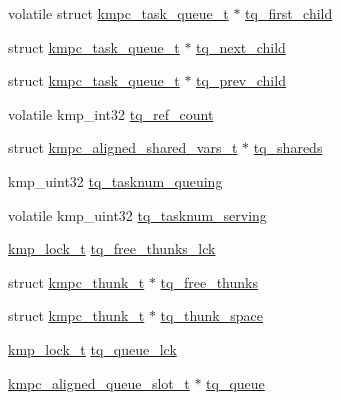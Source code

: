 \begin{DoxyCompactItemize}
\begin{tabbing}
\end{tabbing}\item 
volatile struct \hyperlink{structkmpc__task__queue__t}{kmpc\-\_\-task\-\_\-queue\-\_\-t} $\ast$ \hyperlink{structkmpc__task__queue__t_ada01d183c36f9a0ed158c8f354c78aa3}{tq\-\_\-first\-\_\-child}
\item 
struct \hyperlink{structkmpc__task__queue__t}{kmpc\-\_\-task\-\_\-queue\-\_\-t} $\ast$ \hyperlink{structkmpc__task__queue__t_ac3bcbe8f1494d5a1010ff0009aa2d3e7}{tq\-\_\-next\-\_\-child}
\item 
struct \hyperlink{structkmpc__task__queue__t}{kmpc\-\_\-task\-\_\-queue\-\_\-t} $\ast$ \hyperlink{structkmpc__task__queue__t_ab120e6e740ddd5e3de6e1df41c43b774}{tq\-\_\-prev\-\_\-child}
\item 
volatile kmp\-\_\-int32 \hyperlink{structkmpc__task__queue__t_a4df8f484d6a1c247e69c58c80d22fdb1}{tq\-\_\-ref\-\_\-count}
\item 
struct \hyperlink{structkmpc__aligned__shared__vars__t}{kmpc\-\_\-aligned\-\_\-shared\-\_\-vars\-\_\-t} $\ast$ \hyperlink{structkmpc__task__queue__t_aa91c6d5fa60d60d24b69726f9e99442e}{tq\-\_\-shareds}
\item 
kmp\-\_\-uint32 \hyperlink{structkmpc__task__queue__t_a7b1cdbff4f4f72e05cdf28dbb0b25cc9}{tq\-\_\-tasknum\-\_\-queuing}
\item 
volatile kmp\-\_\-uint32 \hyperlink{structkmpc__task__queue__t_a628cd82e927fca521e942af89f006d59}{tq\-\_\-tasknum\-\_\-serving}
\item 
\hyperlink{kmp__lock_8h_ad1928c8c2d45f7848000a372ec4fde54}{kmp\-\_\-lock\-\_\-t} \hyperlink{structkmpc__task__queue__t_ac4b6aeafed0e9174aeb3706880b5bc56}{tq\-\_\-free\-\_\-thunks\-\_\-lck}
\item 
struct \hyperlink{structkmpc__thunk__t}{kmpc\-\_\-thunk\-\_\-t} $\ast$ \hyperlink{structkmpc__task__queue__t_ae82f0066062ce0785b5407dcf19b6f5d}{tq\-\_\-free\-\_\-thunks}
\item 
struct \hyperlink{structkmpc__thunk__t}{kmpc\-\_\-thunk\-\_\-t} $\ast$ \hyperlink{structkmpc__task__queue__t_a2ba2f7f3ea4c47df06f7220d66a9064e}{tq\-\_\-thunk\-\_\-space}
\item 
\hyperlink{kmp__lock_8h_ad1928c8c2d45f7848000a372ec4fde54}{kmp\-\_\-lock\-\_\-t} \hyperlink{structkmpc__task__queue__t_a55b6f2614333c7fead5b2e8b60f10078}{tq\-\_\-queue\-\_\-lck}
\item 
\hyperlink{structkmpc__aligned__queue__slot__t}{kmpc\-\_\-aligned\-\_\-queue\-\_\-slot\-\_\-t} $\ast$ \hyperlink{structkmpc__task__queue__t_a6db62429603a5a619eddd61a3734704b}{tq\-\_\-queue}

\end{DoxyCompactItemize}
